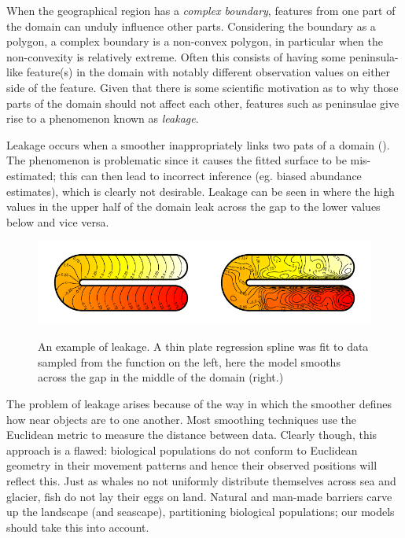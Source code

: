 When the geographical region has a \emph{complex boundary}, features from one part of the domain can unduly influence other parts. Considering the boundary as a polygon, a complex boundary is a non-convex polygon, in particular when the non-convexity is relatively extreme. Often this consists of having some peninsula-like feature(s) in the domain with notably different observation values on either side of the feature. Given that there is some scientific motivation as to why those parts of the domain should not affect each other, features such as peninsulae give rise to a phenomenon known as \emph{leakage}.

Leakage occurs when a smoother inappropriately links two pats of a domain (\cite{soap}). The phenomenon is problematic since it causes the fitted surface to be mis-estimated; this can then lead to incorrect inference (eg. biased abundance estimates), which is clearly not desirable. Leakage can be seen in  where the high values in the upper half of the domain leak across the gap to the lower values below and vice versa.

\begin{figure}
\centering
\includegraphics{intro/figs/ramsay-leak.pdf}\\
\caption{An example of leakage. A thin plate regression spline was fit to data sampled from the function on the left, here the model smooths across the gap in the middle of the domain (right.)}
\label{leakage}
\end{figure}

The problem of leakage arises because of the way in which the smoother defines how near objects are to one another. Most smoothing techniques use the Euclidean metric to measure the distance between data. Clearly though, this approach is a flawed: biological populations do not conform to Euclidean geometry in their movement patterns and hence their observed positions will reflect this. Just as whales no not uniformly distribute themselves across sea and glacier, fish do not lay their eggs on land. Natural and man-made barriers carve up the landscape (and seascape), partitioning biological populations; our models should take this into account.

